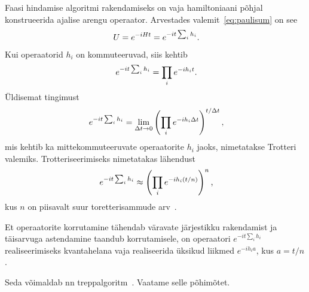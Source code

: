 \documentclass[12pt]{report}
\def\paren#1{\left(#1\right)}
\begin{document}
Faasi hindamise algoritmi rakendamiseks on vaja hamiltoniaani põhjal konstrueerida ajalise arengu operaator.
Arvestades valemit~\eqref{eq:paulisum} on see
\begin{align}
    U = e^{-iHt} = e^{-it\sum_i h_i} \rlap{.}
\end{align}
Kui operaatorid \(h_i\) on kommuteeruvad, siis kehtib
\begin{align}
    e^{-it\sum_i h_i} = \prod_i e^{-i h_i t} \rlap{.}
\end{align}
Üldisemat tingimust
\begin{align}
    e^{-it\sum_i h_i}
    = \lim_{\Delta t \rightarrow 0} \paren{\prod_i e^{-i h_i \Delta t}}^{t / \Delta t} \rlap{,}
\end{align}
mis kehtib ka mittekommuteeruvate operaatorite \(h_i\) jaoks, nimetatakse Trotteri valemiks.
Trotteriseerimiseks nimetatakas lähendust
\begin{align}\label{eq:trot}
    e^{-it\sum_i h_i}
    \approx \paren{\prod_i e^{-i h_i (t / n)}}^n \rlap{,}
\end{align}
kus \(n\) on piisavalt suur toretterisammude arv~\cite{whitfield+etal2011, nielsen+chuang}.

Et operaatorite korrutamine tähendab väravate järjestikku rakendamist ja täisarvuga astendamine taandub korrutamisele, on operaatori \(e^{-i t \sum_i h_i}\) realiseerimiseks kvantahelana vaja realiseerida üksikud liikmed \(e^{-i h_i a}\), kus \(a = t / n\).

Seda võimaldab nn treppalgoritm~\cite{nielsen+chuang, mansky+etal}.
Vaatame selle põhimõtet.
\end{document}
